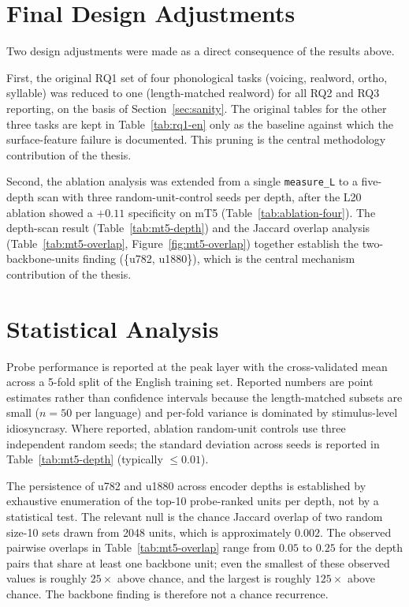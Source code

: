 \section{Final Design Adjustments}
\label{sec:adjustments}

Two design adjustments were made as a direct consequence of the results above.

First, the original RQ1 set of four phonological tasks (voicing, realword, ortho, syllable) was reduced to one (length-matched realword) for all RQ2 and RQ3 reporting, on the basis of Section~\ref{sec:sanity}. The original tables for the other three tasks are kept in Table~\ref{tab:rq1-en} only as the baseline against which the surface-feature failure is documented. This pruning is the central methodology contribution of the thesis.

Second, the ablation analysis was extended from a single \texttt{measure\_L} to a five-depth scan with three random-unit-control seeds per depth, after the L20 ablation showed a $+0.11$ specificity on mT5 (Table~\ref{tab:ablation-four}). The depth-scan result (Table~\ref{tab:mt5-depth}) and the Jaccard overlap analysis (Table~\ref{tab:mt5-overlap}, Figure~\ref{fig:mt5-overlap}) together establish the two-backbone-units finding (\{u782, u1880\}), which is the central mechanism contribution of the thesis.

\section{Statistical Analysis}
\label{sec:stats}

Probe performance is reported at the peak layer with the cross-validated mean across a 5-fold split of the English training set. Reported numbers are point estimates rather than confidence intervals because the length-matched subsets are small ($n = 50$ per language) and per-fold variance is dominated by stimulus-level idiosyncrasy. Where reported, ablation random-unit controls use three independent random seeds; the standard deviation across seeds is reported in Table~\ref{tab:mt5-depth} (typically $\leq 0.01$).

The persistence of u782 and u1880 across encoder depths is established by exhaustive enumeration of the top-10 probe-ranked units per depth, not by a statistical test. The relevant null is the chance Jaccard overlap of two random size-10 sets drawn from 2048 units, which is approximately $0.002$. The observed pairwise overlaps in Table~\ref{tab:mt5-overlap} range from $0.05$ to $0.25$ for the depth pairs that share at least one backbone unit; even the smallest of these observed values is roughly $25\times$ above chance, and the largest is roughly $125\times$ above chance. The backbone finding is therefore not a chance recurrence.

